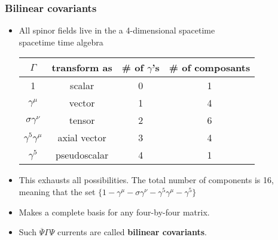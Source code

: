 \label{theoremCode}
\begin{frame}\frametitle{Bilinear covariants}
\begin{itemize}
	\item 

All spinor fields live in the a 4-dimensional spacetime \\
spacetime time algebra

\begin{center}
\begin{tabular}{|c|c|c|c|}\hline
\textbf{$\Gamma$} & \textbf{transform as} & \textbf{\# of $\gamma$'s} & \textbf{\# of composants}\\\hline
1 & scalar & 0 & 1 \\\hline
$\gamma^\mu$ & vector & 1 & 4\\\hline
$\sigma \gamma^\nu$ & tensor & 2 & 6\\\hline
$\gamma^5 \gamma^\mu$ & axial vector & 3 & 4\\\hline
$\gamma^5$ & pseudoscalar & 4 & 1\\\hline
\end{tabular}
\end{center}
	\item 
This exhausts all possibilities. The total number of components is 16, meaning that the set $\{ 1-\gamma^\mu-\sigma \gamma^\nu-\gamma^5 \gamma^\mu-\gamma^5\}$
	\item 
Makes a complete basis for any four-by-four
matrix.
	\item 
Such $\overline{\Psi} \Gamma\Psi$ currents are called \textbf{bilinear covariants}.
\end{itemize}
\end{frame}
